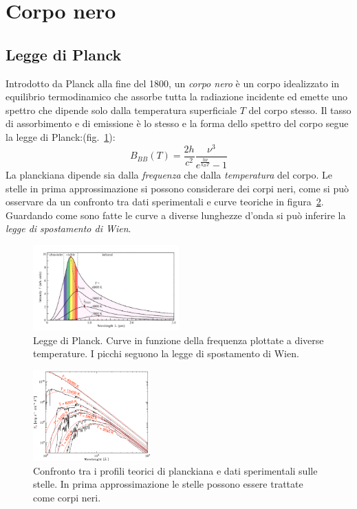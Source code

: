 \section{Corpo nero}\label{sec:corpo-nero}

\subsection{Legge di Planck}\label{sec:legge-planck}
Introdotto da Planck alla fine del 1800, un \emph{corpo nero} è un corpo idealizzato in equilibrio termodinamico che assorbe tutta la radiazione incidente ed emette uno spettro che dipende solo dalla temperatura superficiale $T$ del corpo stesso. Il tasso di assorbimento e di emissione è lo stesso e la forma dello spettro del corpo segue la legge di Planck:(fig.~\ref{fig:corpo-nero}):
\begin{equation}\label{eq:corpo-nero}
    B_{BB} (T) = \frac{2 h}{c^2} \frac{\nu^3}{e^{\frac{h \nu}{k_B T}} - 1}
\end{equation}
La planckiana dipende sia dalla \emph{frequenza} che dalla \emph{temperatura} del corpo. Le stelle in prima approssimazione si possono considerare dei corpi neri, come si può osservare da un confronto tra dati sperimentali e curve teoriche in figura~\ref{fig:stelle-corpi-neri}. Guardando come sono fatte le curve a diverse lunghezze d'onda si può inferire la \emph{legge di spostamento di Wien}.

\begin{figure}
\centering
\includegraphics[width=0.5\textwidth]{immagini/corpo-nero.png}
\caption{Legge di Planck. Curve in funzione della frequenza plottate a diverse temperature. I picchi seguono la legge di spostamento di Wien.}
\label{fig:corpo-nero}
\end{figure}

\begin{figure}
\centering
\includegraphics[width=0.4\textwidth]{immagini/stelle-corpi-neri.png}
\caption{Confronto tra i profili teorici di planckiana e dati sperimentali sulle stelle. In prima approssimazione le stelle possono essere trattate come corpi neri.}
\label{fig:stelle-corpi-neri}
\end{figure}

